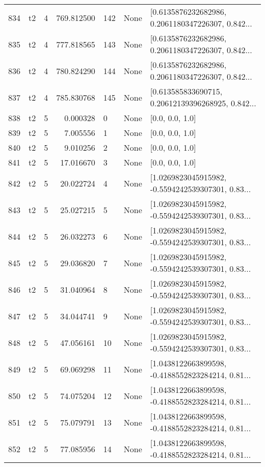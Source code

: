 \begin{tabular}{lllrlll}
834 &  t2 &   4 &   769.812500 &  142 &  None &  [0.6135876232682986, 0.2061180347226307, 0.842... \\
835 &  t2 &   4 &   777.818565 &  143 &  None &  [0.6135876232682986, 0.2061180347226307, 0.842... \\
836 &  t2 &   4 &   780.824290 &  144 &  None &  [0.6135876232682986, 0.2061180347226307, 0.842... \\
837 &  t2 &   4 &   785.830768 &  145 &  None &  [0.613585833690715, 0.20612139396268925, 0.842... \\
838 &  t2 &   5 &     0.000328 &    0 &  None &                                    [0.0, 0.0, 1.0] \\
839 &  t2 &   5 &     7.005556 &    1 &  None &                                    [0.0, 0.0, 1.0] \\
840 &  t2 &   5 &     9.010256 &    2 &  None &                                    [0.0, 0.0, 1.0] \\
841 &  t2 &   5 &    17.016670 &    3 &  None &                                    [0.0, 0.0, 1.0] \\
842 &  t2 &   5 &    20.022724 &    4 &  None &  [1.0269823045915982, -0.5594242539307301, 0.83... \\
843 &  t2 &   5 &    25.027215 &    5 &  None &  [1.0269823045915982, -0.5594242539307301, 0.83... \\
844 &  t2 &   5 &    26.032273 &    6 &  None &  [1.0269823045915982, -0.5594242539307301, 0.83... \\
845 &  t2 &   5 &    29.036820 &    7 &  None &  [1.0269823045915982, -0.5594242539307301, 0.83... \\
846 &  t2 &   5 &    31.040964 &    8 &  None &  [1.0269823045915982, -0.5594242539307301, 0.83... \\
847 &  t2 &   5 &    34.044741 &    9 &  None &  [1.0269823045915982, -0.5594242539307301, 0.83... \\
848 &  t2 &   5 &    47.056161 &   10 &  None &  [1.0269823045915982, -0.5594242539307301, 0.83... \\
849 &  t2 &   5 &    69.069298 &   11 &  None &  [1.0438122663899598, -0.4188552823284214, 0.81... \\
850 &  t2 &   5 &    74.075204 &   12 &  None &  [1.0438122663899598, -0.4188552823284214, 0.81... \\
851 &  t2 &   5 &    75.079791 &   13 &  None &  [1.0438122663899598, -0.4188552823284214, 0.81... \\
852 &  t2 &   5 &    77.085956 &   14 &  None &  [1.0438122663899598, -0.4188552823284214, 0.81... \\

\end{tabular}
